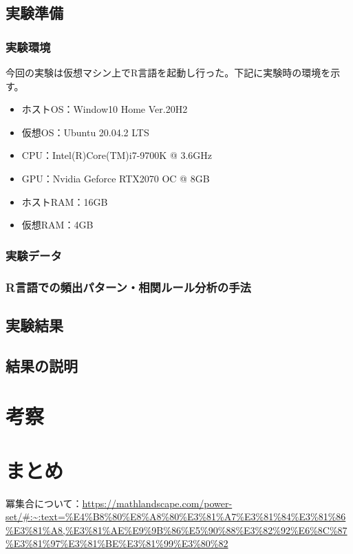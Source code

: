 \documentclass[dvipdfmx]{jsarticle}
\begin{document}
\subsection{実験準備}
  \subsubsection{実験環境}
  今回の実験は仮想マシン上でR言語を起動し行った。下記に実験時の環境を示す。
  \begin{itemize}
    \item ホストOS：Window10 Home Ver.20H2
    \item 仮想OS：Ubuntu 20.04.2 LTS
    \item CPU：Intel(R)Core(TM)i7-9700K @ 3.6GHz
    \item GPU：Nvidia Geforce RTX2070 OC @ 8GB
    \item ホストRAM：16GB
    \item 仮想RAM：4GB
  \end{itemize}
\subsubsection{実験データ}
\subsubsection{R言語での頻出パターン・相関ルール分析の手法}
\subsection{実験結果}
\subsection{結果の説明}

\section{考察}
\section{まとめ}

\begin{thebibliography}{99}
  \bibitem 冪集合について：\url{https://mathlandscape.com/power-set/#:~:text=%E4%B8%80%E8%A8%80%E3%81%A7%E3%81%84%E3%81%86%E3%81%A8,%E3%81%AE%E9%9B%86%E5%90%88%E3%82%92%E6%8C%87%E3%81%97%E3%81%BE%E3%81%99%E3%80%82}
\end{thebibliography}
\end{document}
